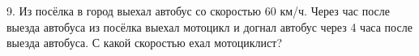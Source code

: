 9. Из посёлка в город выехал автобус со скоростью 60 км/ч. Через час после выезда автобуса из посёлка выехал мотоцикл и догнал автобус через 4 часа после выезда автобуса. С какой скоростью ехал мотоциклист?\\
